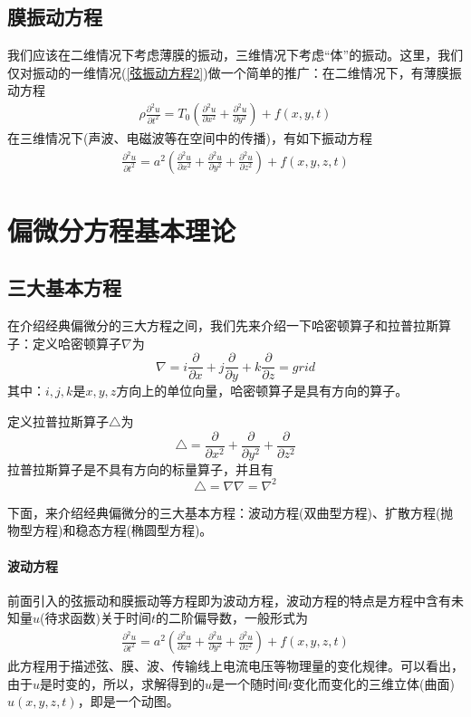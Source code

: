     \subsection{膜振动方程}
        \par
        我们应该在二维情况下考虑薄膜的振动，三维情况下考虑“体”的振动。这里，我们仅对振动的一维情况(\ref{弦振动方程2})做一个简单的推广：在二维情况下，有薄膜振动方程
        \begin{align}
            \label{薄膜振动方程}
            \rho \frac{\partial^2 u}{\partial t ^2} = T_0\left ( \frac{\partial^2 u}{\partial x^2} + \frac{\partial^2 u}{\partial y^2} \right )+ f(x,y,t)
        \end{align}
        在三维情况下(声波、电磁波等在空间中的传播)，有如下振动方程
        \begin{align}
            \label{声波振动方程}
            \frac{\partial^2 u}{\partial t ^2} = a^2 \left ( \frac{\partial^2 u}{\partial x^2} + \frac{\partial^2 u}{\partial y^2} + \frac{\partial^2 u}{\partial z^2} \right )+ f(x,y,z,t)
        \end{align}

\section{偏微分方程基本理论}
    \subsection{三大基本方程}
    \par
    在介绍经典偏微分的三大方程之间，我们先来介绍一下哈密顿算子和拉普拉斯算子：定义哈密顿算子$\nabla$为
    \[
        \nabla = i\frac{\partial}{\partial x} + j\frac{\partial}{\partial y} + k\frac{\partial}{\partial z} = grid
    \]
    其中：$i,j,k$是$x,y,z$方向上的单位向量，哈密顿算子是具有方向的算子。
    \par
    定义拉普拉斯算子$\triangle$为
    \[
        \triangle = \frac{\partial}{\partial x^2} + \frac{\partial}{\partial y^2} + \frac{\partial}{\partial z^2}
    \]
    拉普拉斯算子是不具有方向的标量算子，并且有
    \[
        \triangle = \nabla \nabla = \nabla^2
    \]
    \par
    下面，来介绍经典偏微分的三大基本方程：波动方程(双曲型方程)、扩散方程(抛物型方程)和稳态方程(椭圆型方程)。
    \paragraph{波动方程}
    前面引入的弦振动和膜振动等方程即为波动方程，波动方程的特点是方程中含有未知量$u$(待求函数)关于时间$t$的二阶偏导数，一般形式为
    \begin{align*}
        \frac{\partial^2 u}{\partial t ^2} = a^2 \left ( \frac{\partial^2 u}{\partial x^2} + \frac{\partial^2 u}{\partial y^2} + \frac{\partial^2 u}{\partial z^2} \right )+ f(x,y,z,t)
    \end{align*}
    此方程用于描述弦、膜、波、传输线上电流电压等物理量的变化规律。可以看出，由于$u$是时变的，所以，求解得到的$u$是一个随时间$t$变化而变化的三维立体(曲面)$u(x,y,z,t)$，即是一个动图。
